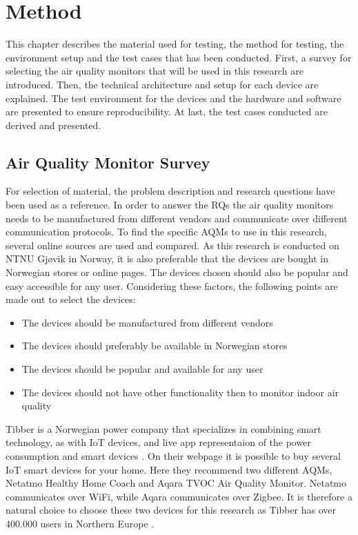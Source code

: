 \chapter{Method}
This chapter describes the material used for testing, the method for testing, the environment setup and the test cases that has been conducted. First, a survey for selecting the air quality monitors that will be used in this research are introduced. Then, the technical architecture and setup for each device are explained. The test environment for the devices and the hardware and software are presented to ensure reproducibility. At last, the test cases conducted are derived and presented. 
\section{Air Quality Monitor Survey}
For selection of material, the problem description and research questions have been used as a reference. In order to answer the RQs the air quality monitors needs to be manufactured from different vendors and communicate over different communication protocols. To find the specific AQMs to use in this research, several online sources are used and compared. As this research is conducted on NTNU Gjøvik in Norway, it is also preferable that the devices are bought in Norwegian stores or online pages. The devices chosen should also be popular and easy accessible for any user. Considering these factors, the following points are made out to select the devices:
\begin{itemize}
    \item The devices should be manufactured from different vendors
    \item The devices should preferably be available in Norwegian stores
    \item The devices should be popular and available for any user
    \item The devices should not have other functionality then to monitor indoor air quality
\end{itemize}
Tibber \cite{Tibber} is a Norwegian power company that specializes in combining smart technology, as with IoT devices, and live app representaion of the power consumption and smart devices \cite{Tibber}. On their webpage it is possible to buy several IoT smart devices for your home. Here they recommend two different AQMs, Netatmo Healthy Home Coach and Aqara TVOC Air Quality Monitor. Netatmo communicates over WiFi, while Aqara communicates over Zigbee. It is therefore a natural choice to choose these two devices for this research as Tibber has over 400.000 users in Northern Europe \cite{TibberUsers}.

